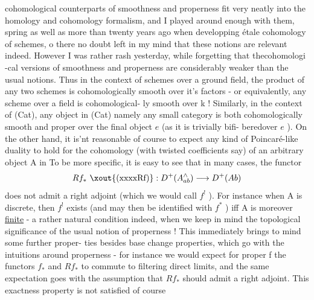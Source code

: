 
cohomological counterparts of smoothness and properness fit very neatly
into the homology and cohomology formalism,  and I played around enough
with them,  spring as well as more than twenty years ago when
developping étale cohomology of schemes, o there  no doubt
left in my mind that these notions are relevant indeed.  However I
 was rather rash yesterday,  while forgetting that thecohomologi
-cal versions of smoothness and properness are considerably weaker than
the usual notions.  Thus in the context of schemes over a ground field,
the product of any two schemes is cohomologically smooth over it's
factors  -  or equivalently,  any scheme over a field is cohomological-%
ly smooth over k !  Similarly,  in the context of (Cat),  any 
object in (Cat)\hand{,} namely any small category\hand{,} is both cohomologically
smooth and proper over the final object $e$  (as it is trivially bifi-%
beredover $e$ ).  On the other hand,  it is'nt reasonable\hand{,} of course to
expect any kind of Poincaré-like duality to hold for the cohomology
(with twisted coefficients say) of an arbitrary object A in  To be
more specific,  it is easy to see that in many cases,  the functor
\[ Rf_{*}\ \text{\xout{(xxxxRf)}} : D^{+}(A^{\wedge}_{ab}) \longrightarrow D^{+}(Ab) \]
does not admit a right adjoint (which we would call $f^{!}$ ).  For instance
when A is discrete,  then $f^{!}$  exists (and may then be identified with
$f^{*}$ ) iff A is moreover \uline{finite}  -  a rather natural condition indeed,
when we keep in mind the topological significance of the usual notion
of properness !  This immediately brings to mind some further proper-%
ties besides base change properties,  which go with the intuitions
around properness  -  for instance we would expect for proper f the
functors $f_{*}$ and $Rf_{*}$ to commute to filtering direct limits, and the
same expectation goes with the assumption that $Rf_{*}$ should admit a
right adjoint.  This exactness property is not satisfied of course
